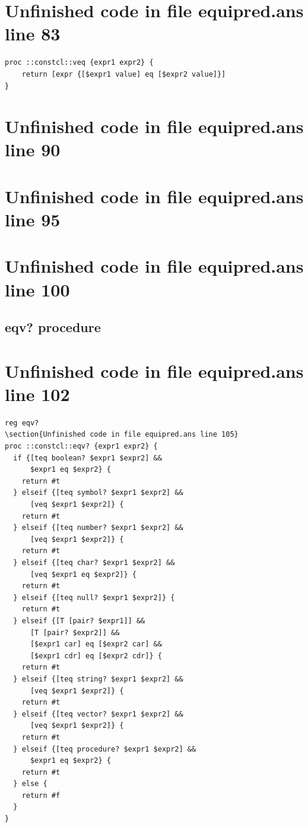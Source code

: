 \documentclass[twoside,9pt]{report}
\begin{document}
\section{Unfinished code in file equipred.ans line 83}
\begin{lstlisting}
proc ::constcl::veq {expr1 expr2} {
    return [expr {[$expr1 value] eq [$expr2 value]}]
}
\end{lstlisting}
\section{Unfinished code in file equipred.ans line 90}
\section{Unfinished code in file equipred.ans line 95}
\section{Unfinished code in file equipred.ans line 100}
\subsection{eqv? procedure}
\label{eqv?-procedure}
\section{Unfinished code in file equipred.ans line 102}
\begin{lstlisting}
reg eqv?
\section{Unfinished code in file equipred.ans line 105}
proc ::constcl::eqv? {expr1 expr2} {
  if {[teq boolean? $expr1 $expr2] &&
      $expr1 eq $expr2} {
    return #t
  } elseif {[teq symbol? $expr1 $expr2] &&
      [veq $expr1 $expr2]} {
    return #t
  } elseif {[teq number? $expr1 $expr2] &&
      [veq $expr1 $expr2]} {
    return #t
  } elseif {[teq char? $expr1 $expr2] &&
      [veq $expr1 eq $expr2]} {
    return #t
  } elseif {[teq null? $expr1 $expr2]} {
    return #t
  } elseif {[T [pair? $expr1]] &&
      [T [pair? $expr2]] &&
      [$expr1 car] eq [$expr2 car] &&
      [$expr1 cdr] eq [$expr2 cdr]} {
    return #t
  } elseif {[teq string? $expr1 $expr2] &&
      [veq $expr1 $expr2]} {
    return #t
  } elseif {[teq vector? $expr1 $expr2] &&
      [veq $expr1 $expr2]} {
    return #t
  } elseif {[teq procedure? $expr1 $expr2] &&
      $expr1 eq $expr2} {
    return #t
  } else {
    return #f
  }
}
\end{lstlisting}
\end{document}
